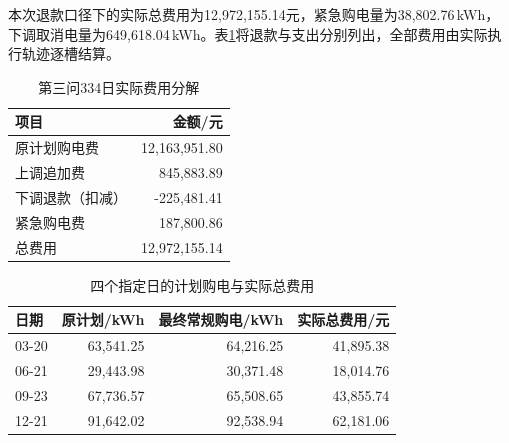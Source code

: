 本次退款口径下的实际总费用为12,972,155.14元，紧急购电量为38,802.76\,kWh，下调取消电量为649,618.04\,kWh。表\ref{tab:q3-cost}将退款与支出分别列出，全部费用由实际执行轨迹逐槽结算。
\begin{table}[htbp]
\centering\small
\caption{第三问334日实际费用分解}\label{tab:q3-cost}
\begin{tabular}{lr}
\toprule
项目 & 金额/元\\
\midrule
原计划购电费 & 12,163,951.80\\
上调追加费 & 845,883.89\\
下调退款（扣减） & -225,481.41\\
紧急购电费 & 187,800.86\\
总费用 & 12,972,155.14\\
\bottomrule
\end{tabular}
\end{table}
\begin{table}[htbp]
\centering\small
\caption{四个指定日的计划购电与实际总费用}\label{tab:q3-daily}
\begin{tabular}{lrrr}
\toprule
日期 & 原计划/kWh & 最终常规购电/kWh & 实际总费用/元\\
\midrule
03-20 & 63,541.25 & 64,216.25 & 41,895.38\\
06-21 & 29,443.98 & 30,371.48 & 18,014.76\\
09-23 & 67,736.57 & 65,508.65 & 43,855.74\\
12-21 & 91,642.02 & 92,538.94 & 62,181.06\\
\bottomrule
\end{tabular}
\end{table}
